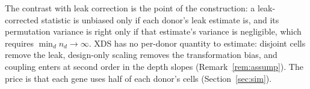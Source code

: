 \documentclass[10pt,letterpaper]{article}
\theoremstyle{definition}
\theoremstyle{remark}
\begin{document}
The contrast with leak correction is the point of the construction: a leak-corrected statistic is unbiased only if each donor's leak estimate is, and its permutation variance is right only if that estimate's variance is negligible, which requires $\min_d n_d\to\infty$. XDS has no per-donor quantity to estimate: disjoint cells remove the leak, design-only scaling removes the transformation bias, and coupling enters at second order in the depth slopes (Remark~\ref{rem:assump}). The price is that each gene uses half of each donor's cells (Section~\ref{sec:sim}).






\clearpage
\appendix

\end{document}
